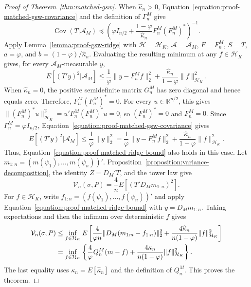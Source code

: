 \documentclass[letterpaper,12pt]{article}
\theoremstyle{definition}
\numberwithin{equation}{section}
\newcommand{\mr}{\mathbb{R}}
\newcommand{\mc}{\mathcal}
\newcommand{\norm}[1]{\lVert#1\rVert}
\DeclareMathOperator{\cov}{Cov}
\begin{document}
\begin{proof}[Proof of Theorem~\ref{thm:matched-gsw}]
When $\widehat\kappa_n>0$, Equation~\eqref{equation:proof-matched-gsw-covariance} and the definition of $\Gamma_n^M$ give
\begin{equation*}
\cov(T|\mc A_M)\preceq\left(\varphi I_{n/2}+\frac{1-\varphi}{\widehat\kappa_n}F_n^M(F_n^M)^*\right)^{-1}.
\end{equation*}
Apply Lemma~\ref{lemma:proof-gsw-ridge} with $\mathcal H=\mc H_K$, $\mathcal A=\mc A_M$, $F=F_n^M$, $S=T$, $a=\varphi$, and $b=(1-\varphi)/\widehat\kappa_n$.
Evaluating the resulting minimum at any $f\in\mc H_K$ gives, for every $\mc A_M$-measurable $y$,
\begin{equation}\label{equation:proof-matched-ridge-bound}
E[(T'y)^2|\mc A_M]\leq\frac1\varphi\norm{y-F_n^Mf}_2^2+\frac{\widehat\kappa_n}{1-\varphi}\norm{f}_{\mc H_K}^2.
\end{equation}
When $\widehat\kappa_n=0$, the positive semidefinite matrix $G_n^M$ has zero diagonal and hence equals zero.
Therefore, $F_n^M(F_n^M)^*=0$.
For every $u\in\mr^{n/2}$, this gives $\norm{(F_n^M)^*u}_{\mc H_K}^2=u'F_n^M(F_n^M)^*u=0$, so $(F_n^M)^*=0$ and $F_n^M=0$.
Since $\Gamma_n^M=\varphi I_{n/2}$, Equation~\eqref{equation:proof-matched-gsw-covariance} gives
\begin{equation*}
E[(T'y)^2|\mc A_M]\leq\frac1\varphi\norm{y}_2^2=\frac1\varphi\norm{y-F_n^Mf}_2^2+\frac{\widehat\kappa_n}{1-\varphi}\norm{f}_{\mc H_K}^2.
\end{equation*}
Thus, Equation~\eqref{equation:proof-matched-ridge-bound} also holds in this case.
Let $m_{1:n}=(m(\psi_1),\ldots,m(\psi_n))'$.
Proposition~\ref{proposition:variance-decomposition}, the identity $Z=D_M'T$, and the tower law give
\begin{equation}
\mc V_n(\sigma,P)=\frac4nE[(T'D_Mm_{1:n})^2].
\end{equation}
For $f\in\mc H_K$, write $f_{1:n}=(f(\psi_1),\ldots,f(\psi_n))'$ and apply Equation~\eqref{equation:proof-matched-ridge-bound} with $y=D_Mm_{1:n}$.
Taking expectations and then the infimum over deterministic $f$ gives
\begin{align}
\mc V_n(\sigma,P)&\leq\inf_{f\in\mc H_K}E\left[\frac4{\varphi n}\norm{D_M(m_{1:n}-f_{1:n})}_2^2+\frac{4\widehat\kappa_n}{n(1-\varphi)}\norm{f}_{\mc H_K}^2\right]\notag\\
&=\inf_{f\in\mc H_K}\left\{\frac4\varphi Q_n^M(m-f)+\frac{4\kappa_n}{n(1-\varphi)}\norm{f}_{\mc H_K}^2\right\}.\label{equation:proof-matched-population-oracle}
\end{align}
The last equality uses $\kappa_n=E[\widehat\kappa_n]$ and the definition of $Q_n^M$.
This proves the theorem.
\end{proof}
\end{document}
